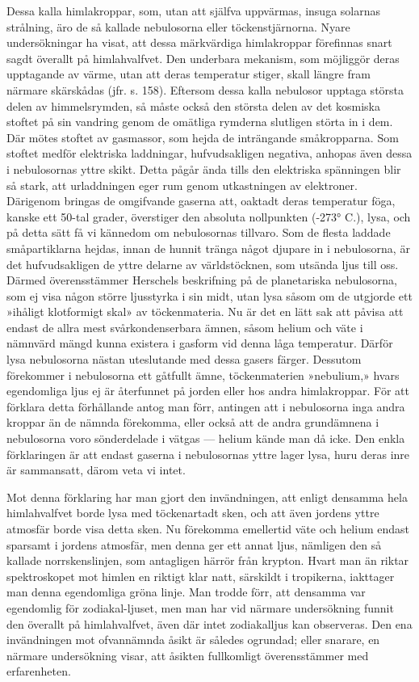\documentclass[a4paper, 12pt, oneside, swedish]{article}
\begin{document}
Dessa kalla himlakroppar, som, utan att själfva uppvärmas, insuga solarnas strålning, äro de så kallade nebulosorna eller töckenstjärnorna. Nyare undersökningar ha visat, att dessa märkvärdiga himlakroppar förefinnas snart sagdt överallt på himlahvalfvet. Den underbara mekanism, som möjliggör deras upptagande av värme, utan att deras temperatur stiger, skall längre fram närmare skärskådas (jfr. s. 158). Eftersom dessa kalla nebulosor upptaga största delen av himmelsrymden, så måste också den största delen av det kosmiska stoftet på sin vandring genom de omätliga rymderna slutligen störta in i dem. Där mötes stoftet av gasmassor, som hejda de inträngande småkropparna. Som stoftet medför elektriska laddningar, hufvudsakligen negativa, anhopas även dessa i nebulosornas yttre skikt. Detta pågår ända tills den elektriska spänningen blir så stark, att urladdningen eger rum genom utkastningen av elektroner. Därigenom bringas de omgifvande gaserna att, oaktadt deras temperatur föga, kanske ett 50-tal grader, överstiger den absoluta nollpunkten (-273° C.), lysa, och på detta sätt få vi kännedom om nebulosornas tillvaro. Som de flesta laddade småpartiklarna hejdas, innan de hunnit tränga något djupare in i nebulosorna, är det hufvudsakligen de yttre delarne av världstöcknen, som utsända ljus till oss. Därmed överensstämmer Herschels beskrifning på de planetariska nebulosorna, som ej visa någon större ljusstyrka i sin midt, utan lysa såsom om de utgjorde ett »ihåligt klotformigt skal» av töckenmateria. Nu är det en lätt sak att påvisa att endast de allra mest svårkondenserbara ämnen, såsom helium och väte i nämnvärd mängd kunna existera i gasform vid denna låga temperatur. Därför lysa nebulosorna nästan uteslutande med dessa gasers färger. Dessutom förekommer i nebulosorna ett gåtfullt ämne, töckenmaterien »nebulium,» hvars egendomliga ljus ej är återfunnet på jorden eller hos andra himlakroppar. För att förklara detta förhållande antog man förr, antingen att i nebulosorna inga andra kroppar än de nämnda förekomma, eller också att de andra grundämnena i nebulosorna voro sönderdelade i vätgas --- helium kände man då icke. Den enkla förklaringen är att endast gaserna i nebulosornas yttre lager lysa, huru deras inre är sammansatt, därom veta vi intet.

Mot denna förklaring har man gjort den invändningen, att enligt densamma hela himlahvalfvet borde lysa med töckenartadt sken, och att även jordens yttre atmosfär borde visa detta sken. Nu förekomma emellertid väte och helium endast sparsamt i jordens atmosfär, men denna ger ett annat ljus, nämligen den så kallade norrskenslinjen, som antagligen härrör från krypton. Hvart man än riktar spektroskopet mot himlen en riktigt klar natt, särskildt i tropikerna, iakttager man denna egendomliga gröna linje. Man trodde förr, att densamma var egendomlig för zodiakal-ljuset, men man har vid närmare undersökning funnit den överallt på himlahvalfvet, även där intet zodiakalljus kan observeras. Den ena invändningen mot ofvannämnda åsikt är således ogrundad; eller snarare, en närmare undersökning visar, att åsikten fullkomligt överensstämmer med erfarenheten.
\end{document}
